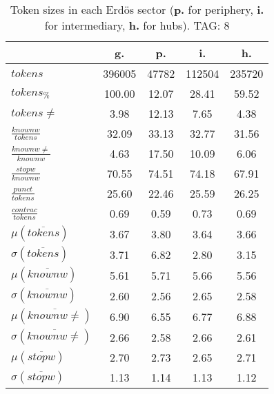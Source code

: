 \begin{table}[h!]
\begin{center}
\begin{tabular}{| l || c | c | c | c |}\hline
 & {\bf g.} & {\bf p.} & {\bf i.} & {\bf h.} \\\hline\hline
$tokens$ & 396005  & 47782  & 112504  & 235720 \\
$tokens_{\%}$ & 100.00  & 12.07  & 28.41  & 59.52 \\
$tokens \neq$ & 3.98  & 12.13  & 7.65  & 4.38 \\\hline
$\frac{knownw}{tokens}$ & 32.09  & 33.13  & 32.77  & 31.56 \\
$\frac{knownw \neq}{knownw}$ & 4.63  & 17.50  & 10.09  & 6.06 \\\hline
$\frac{stopw}{knownw}$ & 70.55  & 74.51  & 74.18  & 67.91 \\
$\frac{punct}{tokens}$ & 25.60  & 22.46  & 25.59  & 26.25 \\
$\frac{contrac}{tokens}$ & 0.69  & 0.59  & 0.73  & 0.69 \\\hline\hline
$\mu(\overline{tokens})$ & 3.67  & 3.80  & 3.64  & 3.66 \\
$\sigma(\overline{tokens})$ & 3.71  & 6.82  & 2.80  & 3.15 \\\hline
$\mu(\overline{knownw})$ & 5.61  & 5.71  & 5.66  & 5.56 \\
$\sigma(\overline{knownw})$ & 2.60  & 2.56  & 2.65  & 2.58 \\\hline
$\mu(\overline{knownw \neq})$ & 6.90  & 6.55  & 6.77  & 6.88 \\
$\sigma(\overline{knownw \neq})$ & 2.66  & 2.58  & 2.66  & 2.61 \\\hline
$\mu(\overline{stopw})$ & 2.70  & 2.73  & 2.65  & 2.71 \\
$\sigma(\overline{stopw})$ & 1.13  & 1.14  & 1.13  & 1.12 \\\hline
\end{tabular}
\caption{Token sizes in each Erd\"os sector ({{\bf p.}} for periphery, {{\bf i.}} for intermediary, {{\bf h.}} for hubs). TAG: 8}
\end{center}
\end{table}